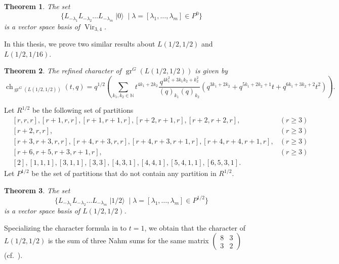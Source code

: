\documentclass[a4paper, 12pt, reqno]{amsart}
\newtheorem{theorem}{Theorem}[section]
\theoremstyle{remark}
\numberwithin{equation}{subsection}
\DeclareMathOperator{\Vir}{Vir}
\DeclareMathOperator{\gr}{gr}
\DeclareMathOperator{\ch}{ch}
\DeclareMathOperator{\vac}{|0\rangle}
\DeclareMathOperator{\vachalf}{|1/2\rangle}
\begin{document}
\begin{theorem}
  \label{thr:2}
  The set
  \begin{equation*}
    \{L_{-\lambda_1}L_{-\lambda_2}\dots L_{-\lambda_m}\vac \mid \lambda = [\lambda_1, \dots, \lambda_m] \in P^0\}
  \end{equation*}
  is a vector space basis of $\Vir_{3, 4}$.
\end{theorem}

In this thesis, we prove two similar results about $L(1/2, 1/2)$ and $L(1/2, 1/16)$.

\begin{theorem}
  \label{thr:3}
  The refined character of $\gr^G(L(1/2, 1/2))$ is given by
  \begin{equation*}
    \ch_{\gr^G(L(1/2, 1/2))}(t, q) = q^{1/2}\left(\sum_{k_1, k_2 \in \mathbb{N}}t^{4k_1 + 2k_2}\frac{q^{4k_1^2 + 3k_1k_2 + k_2^2}}{(q)_{k_1}(q)_{k_2}}(q^{3k_1 + 2k_2} + q^{5k_1 + 2k_2 + 1}t + q^{6k_1 + 3k_2 + 2}t^2)\right).
  \end{equation*}
\end{theorem}

Let $R^{1/2}$ be the following set of partitions
\begin{align*}
  &[r, r, r], [r + 1, r, r], [r + 1, r + 1, r], [r + 2, r + 1, r], [r + 2, r + 2, r], &(r \ge 3) \\
  &[r + 2, r, r], &(r \ge 3) \\
  &[r + 3, r + 3, r, r], [r + 4, r + 3, r, r],  [r + 4, r + 3, r + 1, r], [r + 4, r + 4, r + 1, r], &(r \ge 3)\\
  &[r + 6, r + 5, r + 3, r + 1, r], &(r \ge 3) \\
  &[2], [1, 1, 1], [3, 1, 1], [3, 3], [4, 3, 1], [4, 4, 1], [5, 4, 1, 1], [6, 5, 3, 1].
\end{align*}
Let $P^{1/2}$ be the set of partitions that do not contain any partition in $R^{1/2}$.

\begin{theorem}
  \label{thr:4}
  The set
  \begin{equation*}
    \{L_{-\lambda_1}L_{-\lambda_2}\dots L_{-\lambda_m}\vachalf \mid \lambda = [\lambda_1, \dots, \lambda_m] \in P^{1/2}\}
  \end{equation*}
  is a vector space basis of $L(1/2, 1/2)$.
\end{theorem}

Specializing the character formula in  to $t = 1$, we obtain that the character of $L(1/2, 1/2)$ is the sum of three Nahm sums for the same matrix $\left(\begin{smallmatrix} 8 & 3 \\ 3 & 2 \end{smallmatrix}\right)$ (cf.\ \cite{Nahm2007}).
\end{document}
